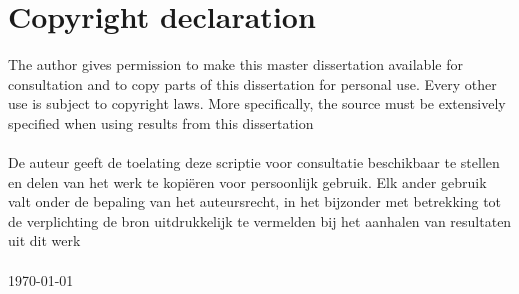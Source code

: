 \chapter*{Copyright declaration}

The author gives permission to make this master dissertation available for consultation and to copy parts of this dissertation for personal use. Every other use is subject to copyright laws. More specifically, the source must be extensively specified when using results from this dissertation
\\
\\
De auteur geeft de toelating deze scriptie voor consultatie beschikbaar te stellen en delen van het werk te kopi\"eren voor persoonlijk gebruik. Elk ander gebruik valt onder de bepaling van het auteursrecht, in het bijzonder met betrekking tot de verplichting de bron uitdrukkelijk te vermelden bij het aanhalen van resultaten uit dit werk
\\
\\
\today{}